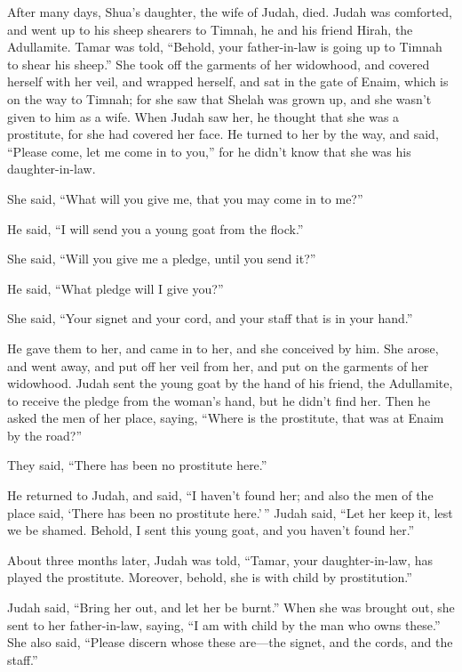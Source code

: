  After many days, Shua's daughter, the wife of Judah,
died. Judah was comforted, and went up to his sheep shearers to Timnah,
he and his friend Hirah, the Adullamite.  Tamar was told,
``Behold, your father-in-law is going up to Timnah to shear his sheep.''
 She took off the garments of her widowhood, and covered
herself with her veil, and wrapped herself, and sat in the gate of
Enaim, which is on the way to Timnah; for she saw that Shelah was grown
up, and she wasn't given to him as a wife.  When Judah
saw her, he thought that she was a prostitute, for she had covered her
face.  He turned to her by the way, and said, ``Please
come, let me come in to you,'' for he didn't know that she was his
daughter-in-law.

She said, ``What will you give me, that you may come in to me?''

 He said, ``I will send you a young goat from the
flock.''

She said, ``Will you give me a pledge, until you send it?''

 He said, ``What pledge will I give you?''

She said, ``Your signet and your cord, and your staff that is in your
hand.''

He gave them to her, and came in to her, and she conceived by him.
 She arose, and went away, and put off her veil from her,
and put on the garments of her widowhood.  Judah sent the
young goat by the hand of his friend, the Adullamite, to receive the
pledge from the woman's hand, but he didn't find her. 
Then he asked the men of her place, saying, ``Where is the prostitute,
that was at Enaim by the road?''

They said, ``There has been no prostitute here.''

 He returned to Judah, and said, ``I haven't found her;
and also the men of the place said, `There has been no prostitute
here.'\,''  Judah said, ``Let her keep it, lest we be
shamed. Behold, I sent this young goat, and you haven't found her.''

 About three months later, Judah was told, ``Tamar, your
daughter-in-law, has played the prostitute. Moreover, behold, she is
with child by prostitution.''

Judah said, ``Bring her out, and let her be burnt.'' 
When she was brought out, she sent to her father-in-law, saying, ``I am
with child by the man who owns these.'' She also said, ``Please discern
whose these are---the signet, and the cords, and the staff.''


